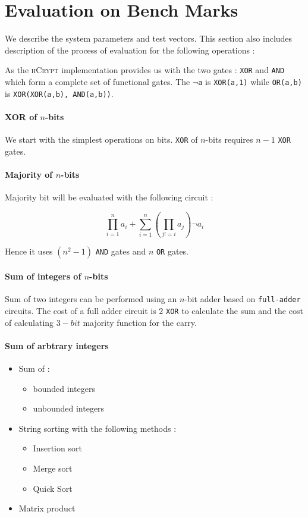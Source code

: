 \documentclass{acm_proc_article-sp}
\begin{document}
\section{Evaluation on Bench Marks}

We describe the system parameters and test vectors. This section also includes description of the process of evaluation for the following operations :


As the \textsc{hCrypt} implementation provides us with the two gates : \texttt{XOR} and \texttt{AND} which form a complete set of functional gates. The $\neg$\texttt{a} is \texttt{XOR(a,1)} while \texttt{OR(a,b)} is \texttt{XOR(XOR(a,b), AND(a,b))}.

\paragraph{ XOR of $n$-bits}

We start with the simplest operations on bits. \texttt{XOR} of $n$-bits requires $n-1$ \texttt{XOR} gates. 

\paragraph{Majority of $n$-bits} 

Majority bit will be evaluated with the following circuit : 

\[\prod_{i=1}^{n}{a_i}+\sum_{i=1}^{n}{(\prod_{j!=i}{a_j}) \neg a_i}\]

Hence it uses $(n^2-1)$ \texttt{AND} gates and $n$ \texttt{OR} gates. 

\paragraph{Sum of integers of $n$-bits} Sum of two integers can be performed using an $n$-bit adder based on \texttt{full-adder} circuits. The cost of a full adder circuit is $2$ \texttt{XOR} to calculate the sum and the cost of calculating $3-bit$ majority function for the carry.

\paragraph{Sum of arbtrary integers}

\begin{itemize}
\item Sum of : 
	\begin{itemize}
	\item  bounded integers
	\item unbounded integers
 	\end{itemize}
\item String sorting with the following methods :
	\begin{itemize}
	\item Insertion sort
	\item Merge sort
	\item Quick Sort
	\end{itemize}
\item Matrix product
\end{itemize}
\end{document}
